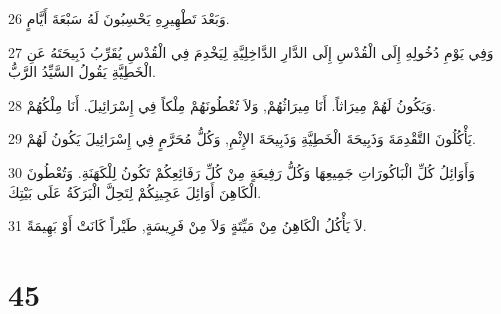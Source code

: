 \par 26 وَبَعْدَ تَطْهِيرِهِ يَحْسِبُونَ لَهُ سَبْعَةَ أَيَّامٍ.
\par 27 وَفِي يَوْمِ دُخُولِهِ إِلَى الْقُدْسِ إِلَى الدَّارِ الدَّاخِلِيَّةِ لِيَخْدِمَ فِي الْقُدْسِ يُقَرِّبُ ذَبِيحَتَهُ عَنِ الْخَطِيَّةِ يَقُولُ السَّيِّدُ الرَّبُّ.
\par 28 وَيَكُونُ لَهُمْ مِيرَاثاً. أَنَا مِيرَاثُهُمْ, وَلاَ تُعْطُونَهُمْ مِلْكاً فِي إِسْرَائِيلَ. أَنَا مِلْكُهُمْ.
\par 29 يَأْكُلُونَ التَّقْدِمَةَ وَذَبِيحَةَ الْخَطِيَّةِ وَذَبِيحَةَ الإِثْمِ, وَكُلُّ مُحَرَّمٍ فِي إِسْرَائِيلَ يَكُونُ لَهُمْ.
\par 30 وَأَوَائِلُ كُلِّ الْبَاكُورَاتِ جَمِيعِهَا وَكُلُّ رَفِيعَةٍ مِنْ كُلِّ رَفَائِعِكُمْ تَكُونُ لِلْكَهَنَةِ. وَتُعْطُونَ الْكَاهِنَ أَوَائِلَ عَجِينِكُمْ لِتَحِلَّ الْبَرَكَةُ عَلَى بَيْتِكَ.
\par 31 لاَ يَأْكُلُ الْكَاهِنُ مِنْ مَيِّتَةٍ وَلاَ مِنْ فَرِيسَةٍ, طَيْراً كَانَتْ أَوْ بَهِيمَةً.

\chapter{45}

